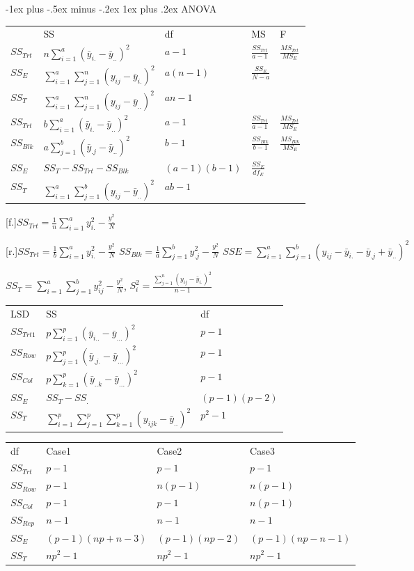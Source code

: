 \documentclass[10pt,portrait]{article}
\makeatletter
\renewcommand{\subsubsection}{\@startsection{subsubsection}{3}{0mm}%
                                {-1ex plus -.5ex minus -.2ex}%
                                {1ex plus .2ex}%
                                {\normalfont\small\bfseries}}
\makeatother
\begin{document}
\begin{multicols}{2}
\subsubsection{ANOVA}
\begin{tabular}{l|l|l|l|l|}
    & SS   &      df     & MS  & F    \\
$SS_{Trt}$&$n\sum^a_{i=1}(\bar y_{i.}-\bar y_{..})^2$&$a-1$&$\frac{SS_{Trt}}{a-1}$&$\frac{MS_{Trt}}{MS_E}$\\
$SS_E$    &$\sum^a_{i=1}\sum^n_{j=1}(y_{ij} - \bar y_{i.})^2$     &$a(n-1)$& $\frac{SS_E}{N-a}$  \\
$SS_T$    &$\sum^a_{i=1}\sum^n_{j=1}(y_{ij}-\bar y_{..})^2$&$an-1$\\
\hline
$SS_{Trt}$&$b\sum^a_{i=1}(\bar y_{i.}-\bar y_{..})^2$&$a-1$&$\frac{SS_{Trt}}{a-1}$&$\frac{MS_{Trt}}{MS_E}$\\
$SS_{Blk}$&$a\sum^b_{j=1}(\bar y_{.j}-\bar y_{..})^2$&$b-1$&$\frac{SS_{Blk}}{b-1}$&$\frac{MS_{Blk}}{MS_E}$\\
$SS_E$    &$SS_T-SS_{Trt}-SS_{Blk}$ &$(a-1)(b-1)$& $\frac{SS_E}{df_E}$&\\
$SS_T$    &$\sum^a_{i=1}\sum^b_{j=1}(y_{ij}-\bar y_{..})^2$&$ab-1$\\
\hline
\end{tabular}

[f.]$SS_{Trt}=\frac1n\sum^a_{i=1}y_{i.}^2-\frac{y_{..}^2}N$

[r.]$SS_{Trt}=\frac1b\sum^a_{i=1}y_{i.}^2-\frac{y_{..}^2}N$
$SS_{Blk}=\frac1a\sum^b_{j=1}y_{.j}^2-\frac{y_{..}^2}N$ 
$SSE=\sum^a_{i=1}\sum^b_{j=1}(y_{ij}-\bar y_{i.}-\bar y_{.j}+\bar y_{..})^2$

$SS_T=\sum^a_{i=1}\sum^b_{j=1}y_{ij}^2-\frac{y_{..}^2}N$, $S^2_i=\frac{\sum_{j=1}^n(y_{ij}-\bar y_{i.})^2}{n-1}$

\begin{tabular}{l|l|l|}
LSD& SS   &      df\\
$SS_{Trt1}$&$p\sum^p_{i=1}(\bar y_{i..}-\bar y_{...})^2$&$p-1$\\
$SS_{Row}$&$p\sum^p_{j=1}(\bar y_{.j.}-\bar y_{...})^2$&$p-1$\\
$SS_{Col}$&$p\sum^p_{k=1}(\bar y_{..k}-\bar y_{...})^2$&$p-1$\\
$SS_E$    &$SS_T-SS_{.}$ &$(p-1)(p-2)$\\
$SS_T$    &$\sum^p_{i=1}\sum^p_{j=1}\sum^p_{k=1}(y_{ijk}-\bar y_{..})^2$&$p^2-1$\\ \hline
\end{tabular}

\begin{tabular}{l|l|l|l|}
df  & Case1 & Case2 & Case3 \\
$SS_{Trt}$&$p-1$&$p-1$&$p-1$\\
$SS_{Row}$&$p-1$&$n(p-1)$&$n(p-1)$\\
$SS_{Col}$&$p-1$&$p-1$&$n(p-1)$\\
$SS_{Rep}$&$n-1$&$n-1$&$n-1$\\
$SS_E$    &$(p-1)(np+n-3)$&$(p-1)(np-2)$&$(p-1)(np-n-1)$\\
$SS_T$    & $np^2-1$ & $np^2-1$ & $np^2-1$\\ \hline
\end{tabular}


\end{multicols}
\end{document}

